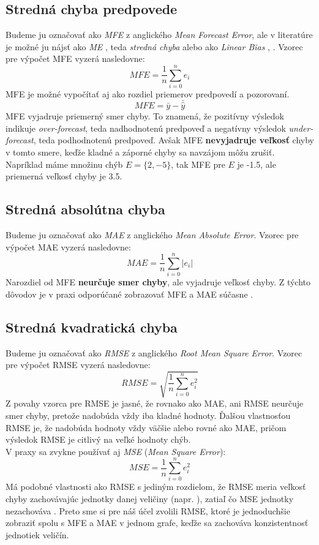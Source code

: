 \subsection{Stredná chyba predpovede}
Budeme ju označovať ako \textit{MFE} z anglického \textit{Mean Forecast Error}, ale v literatúre je možné ju nájsť ako \textit{ME} \cite{RecommendOnVerif}, teda \textit{stredná chyba} alebo ako \textit{Linear Bias} \cite{ContinuousVerif}, \cite{IntroToVerif}. Vzorec pre výpočet MFE vyzerá nasledovne:
\[
	MFE = \frac{1}{n}\sum\limits_{i=0}^{n}  e_i  
\]
MFE je možné vypočítať aj ako rozdiel priemerov predpovedí a pozorovaní.
\[
	MFE = \bar{y} - \bar{\hat{y}}  
\]
MFE vyjadruje priemerný smer chyby. To znamená, že pozitívny výsledok indikuje \textit{over-forecast}, teda nadhodnotenú predpoveď a negatívny výsledok \textit{under-forecast}, teda podhodnotenú predpoveď. Avšak MFE \textbf{nevyjadruje veľkosť} chyby v tomto smere, keďže kladné a záporné chyby sa navzájom môžu zrušiť. 
Napríklad máme množinu chýb $ E = \{2, -5\} $, tak MFE pre $ E $ je -1.5, ale priemerná veľkosť chyby je 3.5.  

\subsection{Stredná absolútna chyba}
Budeme ju označovať ako \textit{MAE} z anglického \textit{Mean Absolute Error}. Vzorec pre výpočet MAE vyzerá nasledovne:
\[
	MAE = \frac{1}{n}\sum\limits_{i=0}^{n} \lvert e_i \rvert 
\]
Narozdiel od MFE \textbf{neurčuje smer chyby}, ale vyjadruje veľkosť chyby. Z týchto dôvodov je v praxi odporúčané zobrazovať MFE a MAE súčasne \cite{RecommendOnVerif}. 

\subsection{Stredná kvadratická chyba}
Budeme ju označovať ako \textit{RMSE} z anglického \textit{Root Mean Square Error}. Vzorec pre výpočet RMSE vyzerá nasledovne:
\[
	RMSE = \sqrt{ \frac{1}{n}\sum\limits_{i=0}^{n} e_i^{2}  }
\]
Z povahy vzorca pre RMSE je jasné, že rovnako ako MAE, ani RMSE neurčuje smer chyby, pretože nadobúda vždy iba kladné hodnoty. 
Ďalšou vlastnosťou RMSE je, že nadobúda hodnoty vždy väčšie alebo rovné ako MAE, pričom výsledok RMSE je citlivý na veľké hodnoty chýb. \\
V praxy sa zvykne používať aj \textit{MSE} (\textit{Mean Square Error}):
\[
	MSE = \frac{1}{n}\sum\limits_{i=0}^{n} e_i^{2} 
\]
Má podobné vlastnosti ako RMSE s jediným rozdielom, že RMSE meria veľkosť chyby zachovávajúc jednotky danej veličiny (napr. \textcelsius), zatiaľ čo MSE jednotky nezachováva \cite{RecommendOnVerif}. Preto sme si pre náš účel zvolili RMSE, ktoré je jednoduchšie zobraziť spolu s MFE a MAE v jednom grafe, keďže sa zachováva konzistentnosť jednotiek veličín.



